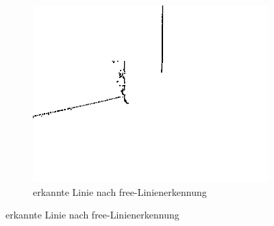 \documentclass[ngerman,a4paper,parskip=half]{scrartcl}
\begin{document}
\begin{figure}[H]
\begin{subfigure}{0.32\textwidth}
		\includegraphics[width=\textwidth]{includes/yellow_0_free.png}
		\caption{erkannte Linie nach free-Linienerkennung}
		\label{fig:yellow_0_free}
	\end{subfigure}
	

\end{figure}
\end{document}
